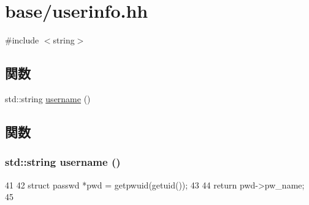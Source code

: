 \hypertarget{userinfo_8hh}{
\section{base/userinfo.hh}
\label{userinfo_8hh}
}
{\ttfamily \#include $<$string$>$}\par
\subsection*{関数}
\begin{DoxyCompactItemize}
\item 
std::string \hyperlink{userinfo_8hh_a1e69448f1c7834990332af7c577dd388}{username} ()
\end{DoxyCompactItemize}


\subsection{関数}
\hypertarget{userinfo_8hh_a1e69448f1c7834990332af7c577dd388}{
\subsubsection[{username}]{\setlength{\rightskip}{0pt plus 5cm}std::string username ()}}
\label{userinfo_8hh_a1e69448f1c7834990332af7c577dd388}



\begin{DoxyCode}
41 {
42     struct passwd *pwd = getpwuid(getuid());
43 
44     return pwd->pw_name;
45 }
\end{DoxyCode}
